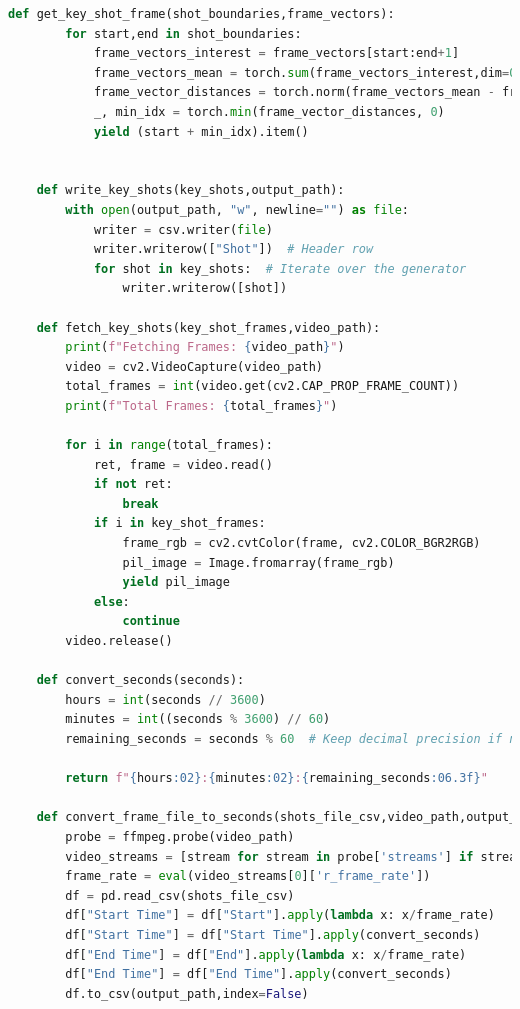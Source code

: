 \documentclass[12pt]{report}
\begin{document}
\begin{lstlisting}[language=Python,caption={Shot Boundary Detection Code}]
	def get_key_shot_frame(shot_boundaries,frame_vectors):
		for start,end in shot_boundaries:
			frame_vectors_interest = frame_vectors[start:end+1]
			frame_vectors_mean = torch.sum(frame_vectors_interest,dim=0) / len(frame_vectors_interest)
			frame_vector_distances = torch.norm(frame_vectors_mean - frame_vectors_interest, dim=1)
			_, min_idx = torch.min(frame_vector_distances, 0)
			yield (start + min_idx).item()
	
	
	def write_key_shots(key_shots,output_path):
		with open(output_path, "w", newline="") as file:
			writer = csv.writer(file)
			writer.writerow(["Shot"])  # Header row
			for shot in key_shots:  # Iterate over the generator
				writer.writerow([shot])
	
	def fetch_key_shots(key_shot_frames,video_path):
		print(f"Fetching Frames: {video_path}")
		video = cv2.VideoCapture(video_path)
		total_frames = int(video.get(cv2.CAP_PROP_FRAME_COUNT))
		print(f"Total Frames: {total_frames}")
	
		for i in range(total_frames):
			ret, frame = video.read()
			if not ret:
				break
			if i in key_shot_frames:
				frame_rgb = cv2.cvtColor(frame, cv2.COLOR_BGR2RGB)
				pil_image = Image.fromarray(frame_rgb)
				yield pil_image
			else:
				continue
		video.release()
	
	def convert_seconds(seconds):
		hours = int(seconds // 3600)
		minutes = int((seconds % 3600) // 60)
		remaining_seconds = seconds % 60  # Keep decimal precision if needed
	
		return f"{hours:02}:{minutes:02}:{remaining_seconds:06.3f}"
	
	def convert_frame_file_to_seconds(shots_file_csv,video_path,output_path):
		probe = ffmpeg.probe(video_path)
		video_streams = [stream for stream in probe['streams'] if stream['codec_type'] == 'video']
		frame_rate = eval(video_streams[0]['r_frame_rate'])
		df = pd.read_csv(shots_file_csv)
		df["Start Time"] = df["Start"].apply(lambda x: x/frame_rate)
		df["Start Time"] = df["Start Time"].apply(convert_seconds)
		df["End Time"] = df["End"].apply(lambda x: x/frame_rate)
		df["End Time"] = df["End Time"].apply(convert_seconds)
		df.to_csv(output_path,index=False)
		

\end{lstlisting}
\end{document}
